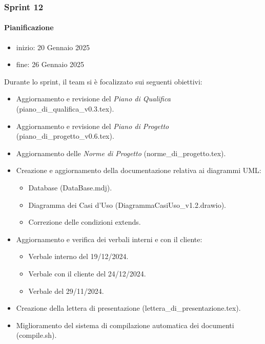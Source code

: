 \documentclass{article}
\begin{document}
            \subsubsection{Sprint 12}
                \paragraph{Pianificazione}
                \begin{itemize}
                    \item inizio: 20 Gennaio 2025
                    \item fine: 26 Gennaio 2025
                \end{itemize}
                Durante lo sprint, il team si è focalizzato sui seguenti obiettivi:
                \begin{itemize}
                    \item Aggiornamento e revisione del \textit{Piano di Qualifica} (piano\_di\_qualifica\_v0.3.tex).
                    \item Aggiornamento e revisione del \textit{Piano di Progetto} (piano\_di\_progetto\_v0.6.tex).
                    \item Aggiornamento delle \textit{Norme di Progetto} (norme\_di\_progetto.tex).
                    \item Creazione e aggiornamento della documentazione relativa ai diagrammi UML:
                    \begin{itemize}
                        \item Database (DataBase.mdj).
                        \item Diagramma dei Casi d'Uso (DiagrammaCasiUso\_v1.2.drawio).
                        \item Correzione delle condizioni extends.
                    \end{itemize}
                    \item Aggiornamento e verifica dei verbali interni e con il cliente:
                    \begin{itemize}
                        \item Verbale interno del 19/12/2024.
                        \item Verbale con il cliente del 24/12/2024.
                        \item Verbale del 29/11/2024.
                    \end{itemize}
                    \item Creazione della lettera di presentazione (lettera\_di\_presentazione.tex).
                    \item Miglioramento del sistema di compilazione automatica dei documenti (compile.sh).
                \end{itemize}
\end{document}
